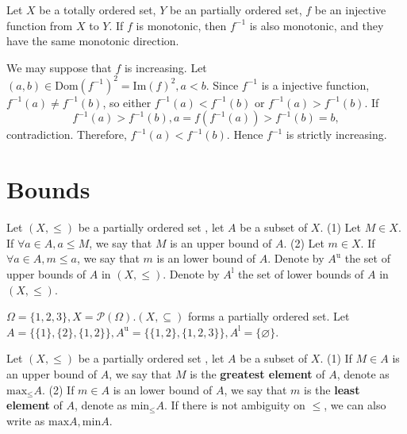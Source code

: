 \begin{propositionenv}
    Let $X$ be a totally ordered set,  $Y$ be an partially ordered set,  $f$ be an injective function from $X$ to $Y$. If $f$ is monotonic,  then $f^{-1}$ is also monotonic,  and they have the same monotonic direction.
\end{propositionenv}
\begin{proofenv}
    We may suppose that $f$ is increasing.
    Let $(a, b)\in \mathrm{Dom}(f^{-1})^2=\mathrm{Im}(f)^2, a<b$. Since $f^{-1}$ is a injective function,  $f^{-1}(a)\not =f^{-1}(b)$,  so either $f^{-1}(a)<f^{-1}(b)$ or $f^{-1}(a)>f^{-1}(b)$. If $$f^{-1}(a)>f^{-1}(b), a=f(f^{-1}(a))>f^{-1}(b)=b, $$ contradiction. Therefore,  $f^{-1}(a)<f^{-1}(b)$. Hence $f^{-1}$ is strictly increasing.
\end{proofenv}
\section{Bounds}
\begin{definitionenv}
    Let $(X, \le)$ be a partially ordered set , let $A$ be a subset of $X$.
    \newline
    (1) Let $M\in X$. If $\forall a \in A , a\le M$,  we say that $M$ is an upper bound of $A$. 
    \newline
    (2) Let $m\in X$. If $\forall a \in A , m\le a$,  we say that $m$ is an lower bound of $A$. 
    \newline
    Denote by $A^\mathrm{u}$ the set of upper bounds of $A$ in $(X, \le)$.
    \newline
     Denote by $A^\mathrm{l}$ the set of lower bounds of $A$ in $(X, \le)$.

\end{definitionenv}
\begin{exampleenv}
    $\Omega=\{1, 2, 3\}, X=\mathscr{P} (\Omega).(X, \subseteq)$ forms a partially ordered set. Let $A=\{\{1\}, \{2\}, \{1, 2\}\}, A^\mathrm{u}=\{\{1, 2\}, \{1, 2, 3\}\}, A^\mathrm{l}=\{\varnothing\}$.
\end{exampleenv}
\begin{definitionenv}
    Let $(X, \le)$ be a partially ordered set , let $A$ be a subset of $X$.
    \newline
    (1) If $M \in A$ is an upper bound of $A$,  we say that $M$ is the \textbf{greatest element} of $A$,  denote as $\mathrm{max}_\le A$.
    \newline
    (2) If $m \in A$ is an lower bound of $A$,  we say that $m$ is the \textbf{least element} of $A$,  denote as $\mathrm{min}_\le A$.
    \newline
    If there is not ambiguity on $\le$, we can also write as $\mathrm{max}A, \mathrm{min}A$.
\end{definitionenv}
